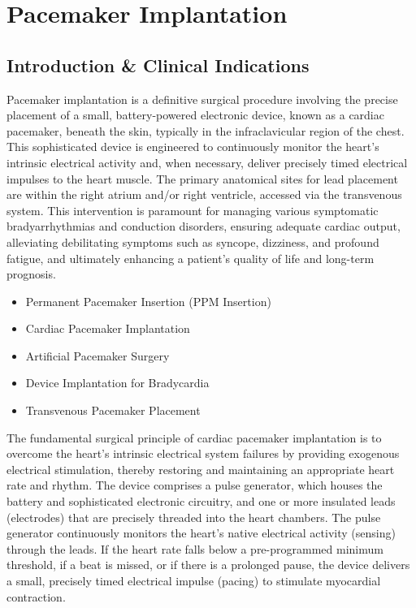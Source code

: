 \chapter{Pacemaker Implantation}

\section*{Introduction \& Clinical Indications}
Pacemaker implantation is a definitive surgical procedure involving the precise placement of a small, battery-powered electronic device, known as a cardiac pacemaker, beneath the skin, typically in the infraclavicular region of the chest. This sophisticated device is engineered to continuously monitor the heart's intrinsic electrical activity and, when necessary, deliver precisely timed electrical impulses to the heart muscle. The primary anatomical sites for lead placement are within the right atrium and/or right ventricle, accessed via the transvenous system. This intervention is paramount for managing various symptomatic bradyarrhythmias and conduction disorders, ensuring adequate cardiac output, alleviating debilitating symptoms such as syncope, dizziness, and profound fatigue, and ultimately enhancing a patient's quality of life and long-term prognosis.

\begin{itemize}
  \item Permanent Pacemaker Insertion (PPM Insertion)
  \item Cardiac Pacemaker Implantation
  \item Artificial Pacemaker Surgery
  \item Device Implantation for Bradycardia
  \item Transvenous Pacemaker Placement
\end{itemize}

The fundamental surgical principle of cardiac pacemaker implantation is to overcome the heart's intrinsic electrical system failures by providing exogenous electrical stimulation, thereby restoring and maintaining an appropriate heart rate and rhythm. The device comprises a pulse generator, which houses the battery and sophisticated electronic circuitry, and one or more insulated leads (electrodes) that are precisely threaded into the heart chambers. The pulse generator continuously monitors the heart's native electrical activity (sensing) through the leads. If the heart rate falls below a pre-programmed minimum threshold, if a beat is missed, or if there is a prolonged pause, the device delivers a small, precisely timed electrical impulse (pacing) to stimulate myocardial contraction.

